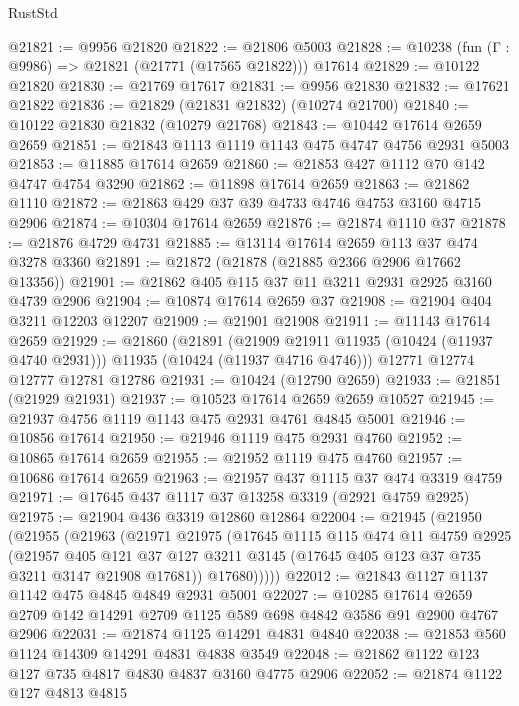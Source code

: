 \begin{lexlean}{RustStd}
\begin{coremodule}
@21821 := @9956 @21820
@21822 := @21806 @5003
@21828 := @10238 (fun (Γ : @9986) => @21821 (@21771 (@17565 @21822))) @17614
@21829 := @10122 @21820
@21830 := @21769 @17617
@21831 := @9956 @21830
@21832 := @17621 @21822
@21836 := @21829 (@21831 @21832) (@10274 @21700)
@21840 := @10122 @21830 @21832 (@10279 @21768)
@21843 := @10442 @17614 @2659 @2659
@21851 := @21843 @1113 @1119 @1143 @475 @4747 @4756 @2931 @5003
@21853 := @11885 @17614 @2659
@21860 := @21853 @427 @1112 @70 @142 @4747 @4754 @3290
@21862 := @11898 @17614 @2659
@21863 := @21862 @1110
@21872 := @21863 @429 @37 @39 @4733 @4746 @4753 @3160 @4715 @2906
@21874 := @10304 @17614 @2659
@21876 := @21874 @1110 @37
@21878 := @21876 @4729 @4731
@21885 := @13114 @17614 @2659 @113 @37 @474 @3278 @3360
@21891 := @21872 (@21878 (@21885 @2366 @2906 @17662 @13356))
@21901 := @21862 @405 @115 @37 @11 @3211 @2931 @2925 @3160 @4739 @2906
@21904 := @10874 @17614 @2659 @37
@21908 := @21904 @404 @3211 @12203 @12207
@21909 := @21901 @21908
@21911 := @11143 @17614 @2659
@21929 := @21860
    (@21891
      (@21909 @21911 @11935 (@10424 (@11937 @4740 @2931)))
      @11935
      (@10424 (@11937 @4716 @4746)))
    @12771
    @12774
    @12777
    @12781
    @12786
@21931 := @10424 (@12790 @2659)
@21933 := @21851 (@21929 @21931)
@21937 := @10523 @17614 @2659 @2659 @10527
@21945 := @21937 @4756 @1119 @1143 @475 @2931 @4761 @4845 @5001
@21946 := @10856 @17614
@21950 := @21946 @1119 @475 @2931 @4760
@21952 := @10865 @17614 @2659
@21955 := @21952 @1119 @475 @4760
@21957 := @10686 @17614 @2659
@21963 := @21957 @437 @1115 @37 @474 @3319 @4759
@21971 := @17645 @437 @1117 @37 @13258 @3319 (@2921 @4759 @2925)
@21975 := @21904 @436 @3319 @12860 @12864
@22004 := @21945
    (@21950
      (@21955
        (@21963
          (@21971
            @21975
            (@17645
              @1115
              @115
              @474
              @11
              @4759
              @2925
              (@21957
                @405
                @121
                @37
                @127
                @3211
                @3145
                (@17645 @405 @123 @37 @735 @3211 @3147 @21908 @17681))
              @17680)))))
@22012 := @21843 @1127 @1137 @1142 @475 @4845 @4849 @2931 @5001
@22027 := @10285
    @17614
    @2659
    @2709
    @142
    @14291
    @2709
    @1125
    @589
    @698
    @4842
    @3586
    @91
    @2900
    @4767
    @2906
@22031 := @21874 @1125 @14291 @4831 @4840
@22038 := @21853 @560 @1124 @14309 @14291 @4831 @4838 @3549
@22048 := @21862 @1122 @123 @127 @735 @4817 @4830 @4837 @3160 @4775 @2906
@22052 := @21874 @1122 @127 @4813 @4815

\end{coremodule}
\end{lexlean}
